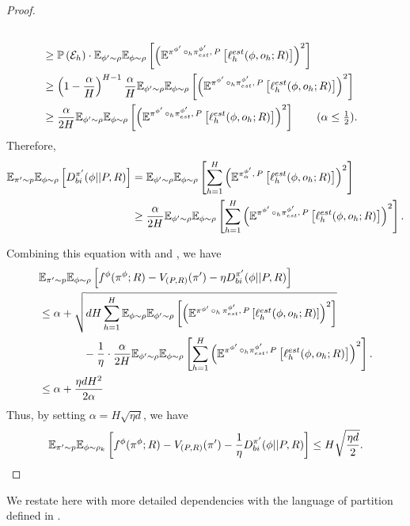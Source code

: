 \begin{proof}
\begin{align*}
    \\& \ge \mathbb{P}\left(\mathcal{E}_h\right)\cdot \E_{\phi' \sim \rho}\E_{\phi \sim \rho}\left[\left(\E^{\pi^{\phi'}\,\circ_h \pi_{est}^{\phi'}, \,P}\left[\ellest_h(\phi, o_h; R)\right]\right)^2\right] 
    \\&\ge \left(1-\frac{\alpha}{H}\right)^{H-1}\frac{\alpha}{H}\E_{\phi' \sim \rho}\E_{\phi \sim \rho}\left[\left(\E^{\pi^{\phi'}\,\circ_h \pi_{est}^{\phi'}, \,P}\left[\ellest_h(\phi, o_h; R)\right]\right)^2\right]
    \\&\ge \frac{\alpha}{2H}\E_{\phi' \sim \rho}\E_{\phi \sim \rho}\left[\left( \E^{\pi^{\phi'}\,\circ_h \pi_{est}^{\phi'}, \,P}\left[\ellest_h(\phi, o_h; R)\right]\right)^2\right] \tag{$\alpha \le \frac{1}{2}$}. 
\end{align*}
Therefore, 
\begin{align*}
    \mathbb{E}_{\pi' \sim p}\mathbb{E}_{\phi \sim \rho}\left[D_{bi}^{\pi'}(\phi||P, R)\right] 
    &= \mathbb{E}_{\phi' \sim \rho}\mathbb{E}_{\phi \sim \rho}\left[\sum_{h=1}^H \left(\mathbb{E}^{\pi_{\alpha}^{\phi'}, \,P}\left[\ell^{est}_h(\phi, o_h; R)\right]\right)^2\right] \\
    &\geq \frac{\alpha}{2H}\mathbb{E}_{\phi' \sim \rho}\mathbb{E}_{\phi \sim \rho}\left[\sum_{h=1}^H \left( \mathbb{E}^{\pi^{\phi'}\,\circ_h \pi_{est}^{\phi'}, \,P}\left[\ell^{est}_h(\phi, o_h; R)\right]\right)^2\right]. 
\end{align*}

Combining this equation with  and , we have
\begin{align*}
    &\mathbb{E}_{\pi' \sim p}\mathbb{E}_{\phi \sim \rho}\left[f^{\phi}(\pi^{\phi}; R) - V_{(P,R)}(\pi')- \eta D_{bi}^{\pi'}(\phi||P, R)\right] \\
    &\le \alpha + \sqrt{dH \sum_{h=1}^H \mathbb{E}_{\phi \sim \rho}\mathbb{E}_{\phi' \sim \rho}\left[\left( \mathbb{E}^{\pi^{\phi'}\,\circ_h \, \pi^{\phi'}_{est} , \,P}\left[\ell^{est}_h(\phi, o_h; R)\right]\right)^2\right]} \\
    &\qquad \qquad - \frac{1}{\eta} \cdot \frac{\alpha}{2H}\mathbb{E}_{\phi' \sim \rho}\mathbb{E}_{\phi \sim \rho}\left[\sum_{h=1}^H \left( \mathbb{E}^{\pi^{\phi'}\,\circ_h \pi_{est}^{\phi'}, \,P}\left[\ell^{est}_h(\phi, o_h; R)\right]\right)^2\right].
    \\&\leq  \alpha + \frac{\eta dH^2}{2 \alpha}
\end{align*}
Thus, by setting $\alpha = H\sqrt{\eta d}$, we have
\begin{align*}
     \mathbb{E}_{\pi' \sim p}\mathbb{E}_{\phi \sim \rho_k}\left[f^{\phi}(\pi^{\phi}; R) - V_{(P,R)}(\pi') - \frac{1}{\eta} D_{bi}^{\pi'}(\phi||P, R)\right] \le H\sqrt{\frac{\eta d}{2}}. 
\end{align*}
\end{proof}
We restate  here with more detailed dependencies with the language of partition defined in . 

